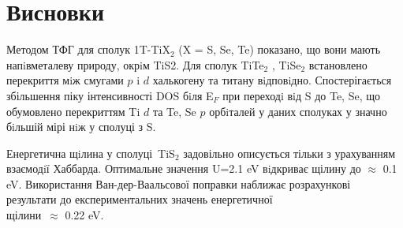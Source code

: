 \chapter*{Висновки}
Методом ТФГ для сполук 1T-TiX$_2$ (X = S, Se, Te) показано, що вони мають напiвметалеву природу, окрiм TiS2. Для сполук TiTe$_2$ , TiSe$_2$ встановлено перекриття мiж смугами $p$ i $d$ халькогену та титану вiдповiдно. Спостерігається збільшення піку інтенсивності DOS бiля E$_F$ при переходi вiд S до Te, Se, що обумовлено перекриттям Ti $d$ та Te, Se $p$ орбiталей у даних сполуках у значно бiльшій мірі нiж у сполуці з S.

Енергетична щiлина у сполуці TiS$_2$ задовільно описується тільки з урахуванням взаємодiї Хаббарда. Оптимальне значення U=2.1 eV вiдкриває щілину до $\approx$ 0.1 eV. Використання Ван-дер-Ваальсової поправки наближає розрахункові результати до експериментальних значень енергетичної \\
 щілини $\approx$ 0.22 eV.